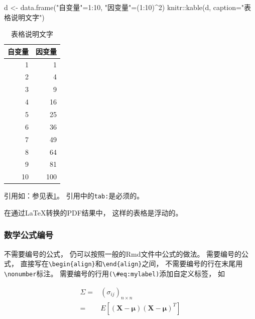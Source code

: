 \documentclass[
]{article}
\newenvironment{Shaded}{\begin{snugshade}}{\end{snugshade}}
\newcommand{\AttributeTok}[1]{\textcolor[rgb]{0.77,0.63,0.00}{#1}}
\newcommand{\DecValTok}[1]{\textcolor[rgb]{0.00,0.00,0.81}{#1}}
\newcommand{\FunctionTok}[1]{\textcolor[rgb]{0.00,0.00,0.00}{#1}}
\newcommand{\NormalTok}[1]{#1}
\newcommand{\OtherTok}[1]{\textcolor[rgb]{0.56,0.35,0.01}{#1}}
\newcommand{\SpecialCharTok}[1]{\textcolor[rgb]{0.00,0.00,0.00}{#1}}
\newcommand{\StringTok}[1]{\textcolor[rgb]{0.31,0.60,0.02}{#1}}
\begin{document}
\begin{Shaded}
\begin{Highlighting}[]
\NormalTok{d }\OtherTok{\textless{}{-}} \FunctionTok{data.frame}\NormalTok{(}\StringTok{"自变量"}\OtherTok{=}\DecValTok{1}\SpecialCharTok{:}\DecValTok{10}\NormalTok{, }\StringTok{"因变量"}\OtherTok{=}\NormalTok{(}\DecValTok{1}\SpecialCharTok{:}\DecValTok{10}\NormalTok{)}\SpecialCharTok{\^{}}\DecValTok{2}\NormalTok{)}
\NormalTok{knitr}\SpecialCharTok{::}\FunctionTok{kable}\NormalTok{(d, }\AttributeTok{caption=}\StringTok{"表格说明文字"}\NormalTok{)}
\end{Highlighting}
\end{Shaded}

\begin{table}

\caption{\label{tab:u-w-tab-ex01}表格说明文字}
\centering
\begin{tabular}[t]{r|r}
\hline
自变量 & 因变量\\
\hline
1 & 1\\
\hline
2 & 4\\
\hline
3 & 9\\
\hline
4 & 16\\
\hline
5 & 25\\
\hline
6 & 36\\
\hline
7 & 49\\
\hline
8 & 64\\
\hline
9 & 81\\
\hline
10 & 100\\
\hline
\end{tabular}
\end{table}

引用如：参见表\ref{tab:u-w-tab-ex01}。
引用中的\texttt{tab:}是必须的。

在通过LaTeX转换的PDF结果中，
这样的表格是浮动的。

\hypertarget{usage-writing-math}{%
\subsubsection{数学公式编号}\label{usage-writing-math}}

不需要编号的公式，
仍可以按照一般的Rmd文件中公式的做法。
需要编号的公式，
直接写在\texttt{\textbackslash{}begin\{align\}}和\texttt{\textbackslash{}end\{align\}}之间，
不需要编号的行在末尾用\texttt{\textbackslash{}nonumber}标注。
需要编号的行用\texttt{(\textbackslash{}\#eq:mylabel)}添加自定义标签，
如

\begin{align}
\Sigma =&  (\sigma_{ij})_{n\times n} \nonumber \\
=& E[(\boldsymbol{X} - \boldsymbol{\mu}) (\boldsymbol{X} - \boldsymbol{\mu})^T ] 
\label{eq:var-mat-def}
\end{align}
\end{document}
